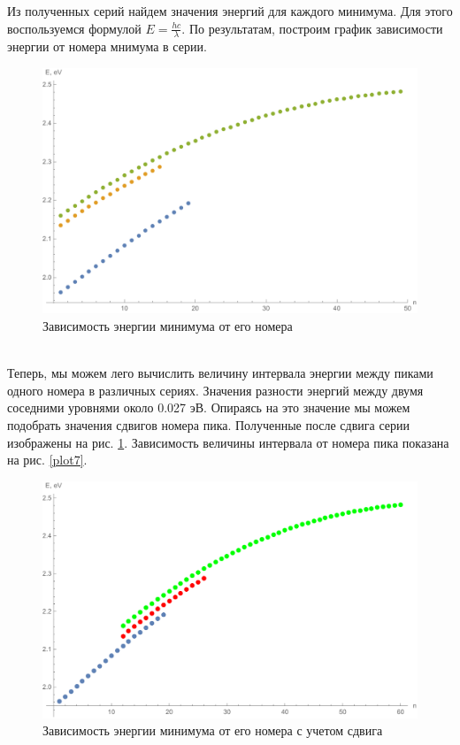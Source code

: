 \documentclass[a4paper, 12pt]{article}
\begin{document}
Из полученных серий найдем значения энергий для каждого минимума. Для этого воспользуемся формулой $E=\frac{h c}{\lambda}$. По результатам, построим график зависимости энергии от номера мнимума в серии.
\begin{figure}[!htb]
\centering
\includegraphics[scale=0.7]{plot5.pdf}
\caption{Зависимость энергии минимума от его номера}
\end{figure}\\
Теперь, мы можем лего вычислить величину интервала энергии между пиками одного номера в различных сериях. Значения разности энергий между двумя соседними уровнями около 0.027 эВ. Опираясь на это значение мы можем подобрать значения сдвигов номера пика. Полученные после сдвига серии изображены на рис. \ref{plot6}. Зависимость величины интервала от номера пика показана на рис. \ref{plot7}.
\begin{figure}[!htb]
\centering
\includegraphics[scale=0.6]{plot6.pdf}
\caption{Зависимость энергии минимума от его номера с учетом сдвига}
\label{plot6}
\end{figure}
\end{document}
